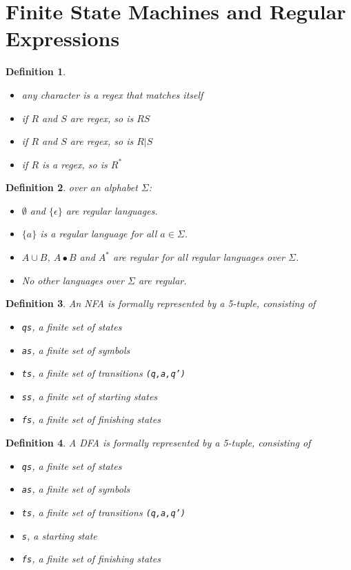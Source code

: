 \documentclass{article}
\theoremstyle{sltheorem}
\newtheorem{definition}{Definition}
\begin{document}
\section{Finite State Machines and Regular Expressions}
\begin{definition}
    \begin{itemize}
        \item any character is a regex that matches itself
        \item if $R$ and $S$ are regex, so is $RS$
        \item if $R$ and $S$ are regex, so is $R|S$
        \item if $R$ is a regex, so is $R^*$
    \end{itemize}
\end{definition}
\begin{definition}
     over an alphabet $\Sigma$:
    \begin{itemize}
        \item $\emptyset$ and $\{\epsilon\}$ are regular languages.
        \item $\{a\}$ is a regular language for all $a\in\Sigma$.
        \item $A\cup B$, $A\bullet B$ and $A^*$ are regular for all regular languages over $\Sigma$.
        \item No other languages over $\Sigma$ are regular.
    \end{itemize}
\end{definition}
\begin{definition}
    An NFA is formally represented by a 5-tuple, consisting of
    \begin{itemize}
        \item \texttt{qs}, a finite set of states
        \item \texttt{as}, a finite set of symbols
        \item \texttt{ts}, a finite set of transitions \texttt{(q,a,q')}
        \item \texttt{ss}, a finite set of starting states
        \item \texttt{fs}, a finite set of finishing states
    \end{itemize}
\end{definition}
\begin{definition}
    A DFA is formally represented by a 5-tuple, consisting of
    \begin{itemize}
        \item \texttt{qs}, a finite set of states
        \item \texttt{as}, a finite set of symbols
        \item \texttt{ts}, a finite set of transitions \texttt{(q,a,q')}
        \item \texttt{s}, a starting state
        \item \texttt{fs}, a finite set of finishing states
    \end{itemize}
\end{definition}
\end{document}
